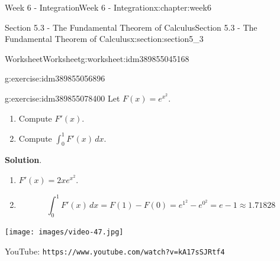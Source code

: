 \documentclass[oneside,10pt,]{book}
\newcommand{\blocktitlefont}{\relax}
\newcommand{\mono}[1]{\texttt{#1}}
\numberwithin{equation}{section}
\newlength{\qrsize}
\newlength{\previewwidth}
\begin{document}
\begin{chapterptx}{Week 6 - Integration}{}{Week 6 - Integration}{}{}{x:chapter:week6}
\begin{sectionptx}{Section 5.3 - The Fundamental Theorem of Calculus}{}{Section 5.3 - The Fundamental Theorem of Calculus}{}{}{x:section:section5_3}
\begin{worksheet-subsection}{Worksheet}{}{Worksheet}{}{}{g:worksheet:idm389855045168}
\begin{divisionexercise}{2}{}{}{g:exercise:idm389855056896}
\begin{equation*}
\end{equation*}
\end{divisionexercise}%
\begin{divisionexercise}{3}{}{}{g:exercise:idm389855078400}%
\footnotemark{}Let \(F(x) = e^{x^2}\).%
%
\begin{enumerate}[label=(\alph*)]
\item{}Compute \(F'(x)\).%
\item{}Compute \(\displaystyle \int_0^1 F'(x) \, dx\).%
\end{enumerate}
\textbf{\blocktitlefont Solution}.\hypertarget{g:solution:idm389855109600}{}\quad{}%
\begin{enumerate}[label=(\alph*)]
\item{}\(F'(x)=2xe^{x^2}\).%
\item{}%
\begin{equation*}
\int_0^1 F'(x) \, dx = F(1)-F(0) = e^{1^2}-e^{0^2} = e-1 \approx 1.71828
\end{equation*}
%
\end{enumerate}
\end{divisionexercise}%
%
\end{worksheet-subsection}
\restoregeometry
\setlength{\qrsize}{9em}
\setlength{\previewwidth}{\linewidth}
\addtolength{\previewwidth}{-\qrsize}
\begin{tcbraster}[raster columns=2, raster column skip=1pt, raster halign=center, raster force size=false, raster left skip=0pt, raster right skip=0pt]%
\begin{tcolorbox}[previewstyle, width=\previewwidth]%
\texttt{[image: images/video-47.jpg]}%
\end{tcolorbox}%
\begin{tcolorbox}[qrstyle]%
{\hypersetup{urlcolor=black}}%
\end{tcolorbox}%
\begin{tcolorbox}[captionstyle]%
\small YouTube: \mono{https://www.youtube.com/watch?v=kA17sSJRtf4}\end{tcolorbox}%
\end{tcbraster}%
\end{sectionptx}
\end{chapterptx}
%
%
\typeout{************************************************}
\typeout{************************************************}
%
\end{document}
